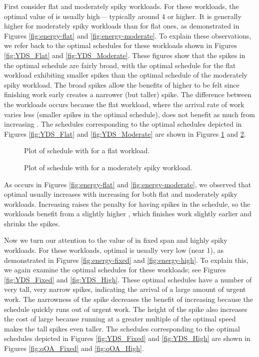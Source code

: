 \documentclass[11pt]{article}
\begin{document}
First consider flat and moderately spiky workloads.
For these workloads, the optimal value of  is usually high---
typically around 4 or higher.
It is generally higher for moderately spiky workloads than for flat
ones, as demonstrated in Figures \ref{fig:energy-flat} and
\ref{fig:energy-moderate}.
To explain these observations, we refer back to the optimal schedules
for these workloads shown in Figures \ref{fig:YDS_Flat} and
\ref{fig:YDS_Moderate}.
These figures show that the spikes in the optimal schedule are fairly
broad, with the optimal schedule for the flat workload exhibiting
smaller spikes than the optimal schedule of the moderately spiky
workload.
The broad spikes allow the benefits of higher  to be felt since
finishing work early creates a narrower (but taller) spike.
The difference between the workloads occurs because 
the flat workload, where the arrival rate of work varies less (smaller
spikes in the optimal schedule), does not benefit as much from
increasing .
The  schedules corresponding to the optimal schedules depicted in
Figures \ref{fig:YDS_Flat} and
\ref{fig:YDS_Moderate} are shown in 
Figures \ref{fig:qOA_Flat} and \ref{fig:qOA_Moderate}.

\begin{figure}
\centering
{}
\caption{Plot of  schedule with  for a flat workload.}
\label{fig:qOA_Flat}
\end{figure}

\begin{figure}
\centering
{}
\caption{Plot of  schedule with  for a moderately
  spiky workload.}
\label{fig:qOA_Moderate}
\end{figure}

As occurs in Figures \ref{fig:energy-flat} and
\ref{fig:energy-moderate}, we observed that optimal  usually
increases with increasing  for both flat and
moderately spiky workloads.
Increasing  raises the penalty for having spikes in the
schedule, so the workloads benefit from a slightly higher , which
finishes work slightly earlier and shrinks the spikes.

Now we turn our attention to the value of  in fixed span and
highly spiky workloads.
For these workloads, optimal 
is usually very low (near 1), as demonstrated in Figures
\ref{fig:energy-fixed} and \ref{fig:energy-high}.
To explain this, we again examine the optimal schedules for these
workloads; see Figures \ref{fig:YDS_Fixed} and \ref{fig:YDS_High}.
These optimal schedules have a number of very tall, very narrow spikes,
indicating the arrival of a large amount of urgent work.
The narrowness of the spike decreases the benefit of
increasing  because the schedule quickly runs out of urgent work.
The height of the spike also increases the cost of large  because
running at a greater multiple of the optimal speed makes the tall
spikes even taller.
The  schedules corresponding to the optimal schedules depicted in
Figures \ref{fig:YDS_Fixed} and \ref{fig:YDS_High} are shown in 
Figures \ref{fig:qOA_Fixed} and \ref{fig:qOA_High}.
\end{document}
